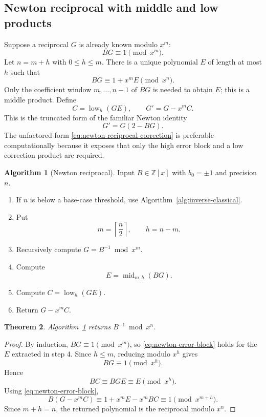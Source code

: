 \documentclass[11pt]{book}
\newtheorem{theorem}{Theorem}[section]
\theoremstyle{definition}
\newtheorem{algorithm}[theorem]{Algorithm}
\newcommand{\ZZ}{\mathbb Z}
\begin{document}
\subsection{Newton reciprocal with middle and low products}

Suppose a reciprocal $G$ is already known modulo $x^m$:
\[
 BG\equiv1\pmod{x^m}.
\]
Let $n=m+h$ with $0\leq h\leq m$.  There is a unique polynomial $E$ of length
at most $h$ such that
\begin{equation}\label{eq:newton-error-block}
 BG\equiv1+x^mE\pmod{x^n}.
\end{equation}
Only the coefficient window $m,\ldots,n-1$ of $BG$ is needed to obtain $E$;
this is a middle product.  Define
\begin{equation}\label{eq:newton-reciprocal-correction}
 C=\operatorname{low}_h(GE),
 \qquad
 G'=G-x^mC.
\end{equation}
This is the truncated form of the familiar Newton identity
\[
 G' = G(2-BG).
\]
The unfactored form \eqref{eq:newton-reciprocal-correction} is preferable
computationally because it exposes that only the high error block and a low
correction product are required.

\begin{algorithm}[Newton reciprocal]\label{alg:newton-reciprocal}
Input $B\in\ZZ[x]$ with $b_0=\pm1$ and precision $n$.
\begin{enumerate}
 \item If $n$ is below a base-case threshold, use
 Algorithm~\ref{alg:inverse-classical}.
 \item Put
 \[
   m=\left\lceil\frac n2\right\rceil,
   \qquad h=n-m.
 \]
 \item Recursively compute $G=B^{-1}\bmod x^m$.
 \item Compute
 \[
   E=\operatorname{mid}_{m,h}(BG).
 \]
 \item Compute $C=\operatorname{low}_h(GE)$.
 \item Return $G-x^mC$.
\end{enumerate}
\end{algorithm}

\begin{theorem}\label{thm:newton-reciprocal-correctness}
Algorithm~\ref{alg:newton-reciprocal} returns
$B^{-1}\bmod x^n$.
\end{theorem}

\begin{proof}
By induction, $BG\equiv1\pmod{x^m}$, so
\eqref{eq:newton-error-block} holds for the $E$ extracted in step 4.  Since
$h\leq m$, reducing modulo $x^h$ gives
\[
 BG\equiv1\pmod{x^h}.
\]
Hence
\[
 B C
 \equiv BGE
 \equiv E
 \pmod{x^h}.
\]
Using \eqref{eq:newton-error-block},
\[
 B(G-x^mC)
 \equiv 1+x^mE-x^mBC
 \equiv1
 \pmod{x^{m+h}}.
\]
Since $m+h=n$, the returned polynomial is the reciprocal modulo $x^n$.
\end{proof}
\end{document}
